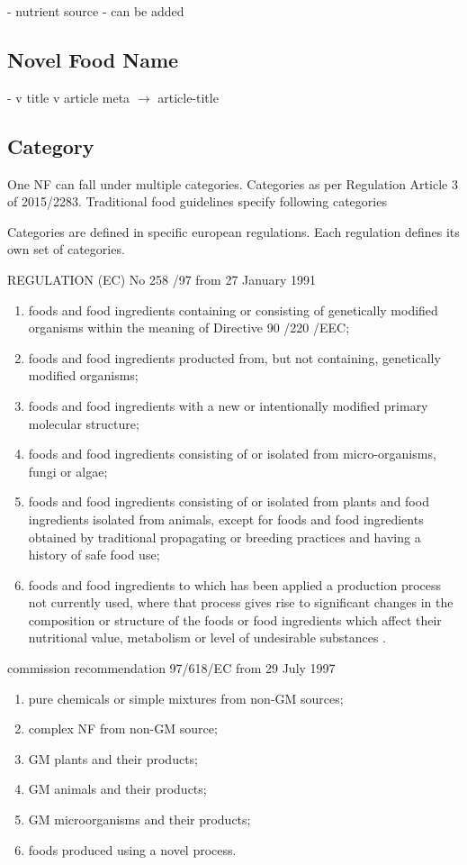 \documentclass[12pt]{article}
\begin{document}
- nutrient source - can be added

\subsection{Novel Food Name}
- v title v article meta $\rightarrow$ article-title

\subsection{Category}
One NF can fall under multiple categories.
Categories as per Regulation Article 3 of 2015/2283.
Traditional food guidelines specify following categories

Categories are defined in specific european regulations. Each regulation defines its own set of categories.

REGULATION (EC) No 258 /97 from 27 January 1991

\begin{enumerate}[label=(\alph*)]
    \item foods and food ingredients containing or consisting of genetically modified organisms within the meaning of Directive 90 /220 /EEC;
    \item foods and food ingredients producted from, but not containing, genetically modified organisms;
    \item foods and food ingredients with a new or intentionally modified primary molecular structure;
    \item foods and food ingredients consisting of or isolated from micro-organisms, fungi or algae;
    \item foods and food ingredients consisting of or isolated from plants and food ingredients isolated from animals, except for foods and food ingredients obtained by traditional propagating or breeding prac­tices and having a history of safe food use;
    \item foods and food ingredients to which has been applied a production process not currently used, where that process gives rise to significant changes in the com­position or structure of the foods or food ingredients which affect their nutritional value, metabolism or level of undesirable substances .
\end{enumerate}

commission recommendation 97/618/EC from 29 July 1997

\begin{enumerate}[label=(\alph*)]
    \item pure chemicals or simple mixtures from non-GM sources;
    \item complex NF from non-GM source;
    \item GM plants and their products;
    \item GM animals and their products;
    \item GM microorganisms and their products;
    \item foods produced using a novel process.
\end{enumerate}
\end{document}
